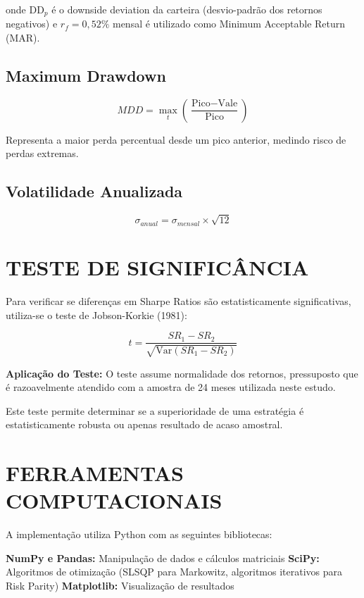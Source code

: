 onde $\text{DD}_p$ é o downside deviation da carteira (desvio-padrão dos retornos negativos) e $r_f = 0,52\%$ mensal é utilizado como Minimum Acceptable Return (MAR).

\subsection{Maximum Drawdown}

\begin{equation}
MDD = \max_{t} \left( \frac{\text{Pico} - \text{Vale}}{\text{Pico}} \right)
\end{equation}

Representa a maior perda percentual desde um pico anterior, medindo risco de perdas extremas.

\subsection{Volatilidade Anualizada}

\begin{equation}
\sigma_{anual} = \sigma_{mensal} \times \sqrt{12}
\end{equation}

\section{TESTE DE SIGNIFICÂNCIA}

Para verificar se diferenças em Sharpe Ratios são estatisticamente significativas, utiliza-se o teste de Jobson-Korkie (1981):

\begin{equation}
t = \frac{SR_1 - SR_2}{\sqrt{\text{Var}(SR_1 - SR_2)}}
\end{equation}

\textbf{Aplicação do Teste:} O teste assume normalidade dos retornos, pressuposto que é razoavelmente atendido com a amostra de 24 meses utilizada neste estudo.

Este teste permite determinar se a superioridade de uma estratégia é estatisticamente robusta ou apenas resultado de acaso amostral.

\section{FERRAMENTAS COMPUTACIONAIS}

A implementação utiliza Python com as seguintes bibliotecas:

\textbf{NumPy e Pandas:} Manipulação de dados e cálculos matriciais
\textbf{SciPy:} Algoritmos de otimização (SLSQP para Markowitz, algoritmos iterativos para Risk Parity)
\textbf{Matplotlib:} Visualização de resultados

